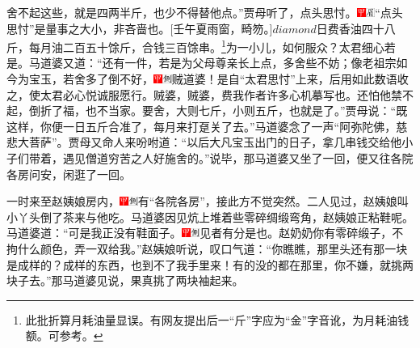 舍不起这些，就是四两半斤，也少不得替他点。”贾母听了，点头思忖。{\includegraphics[width=3mm]{../Images/00002}\includegraphics[width=3mm]{../Images/00010}\footnotesize \kaishu “点头思忖”是量事之大小，非吝啬也。{[}壬午夏雨窗，畸笏。{]}$diamond$日费香油四十八斤，每月油二百五十馀斤，合钱三百馀串。\footnote{此批折算月耗油量显误。有网友提出后一“斤”字应为“金”字音讹，为月耗油钱额。可参考。}为一小儿，如何服众？太君细心若是。}马道婆又道：“还有一件，若是为父母尊亲长上点，多舍些不妨；像老祖宗如今为宝玉，若舍多了倒不好，{\includegraphics[width=3mm]{../Images/00002}\includegraphics[width=3mm]{../Images/00011}\footnotesize \kaishu 贼道婆！是自“太君思忖”上来，后用如此数语收之，使太君必心悦诚服愿行。贼婆，贼婆，费我作者许多心机摹写也。}还怕他禁不起，倒折了福，也不当家。要舍，大则七斤，小则五斤，也就是了。”贾母说：“既这样，你便一日五斤合准了，每月来打趸关了去。”马道婆念了一声“阿弥陀佛，慈悲大菩萨”。贾母又命人来吩咐道：“以后大凡宝玉出门的日子，拿几串钱交给他小子们带着，遇见僧道穷苦之人好施舍的。”说毕，那马道婆又坐了一回，便又往各院各房问安，闲逛了一回。

一时来至赵姨娘房内，{\includegraphics[width=3mm]{../Images/00002}\includegraphics[width=3mm]{../Images/00011}\footnotesize \kaishu 有“各院各房”，接此方不觉突然。}二人见过，赵姨娘叫小丫头倒了茶来与他吃。马道婆因见炕上堆着些零碎绸缎弯角，赵姨娘正粘鞋呢。马道婆道：“可是我正没有鞋面子。{\includegraphics[width=3mm]{../Images/00002}\includegraphics[width=3mm]{../Images/00011}\footnotesize \kaishu 见者有分是也。}赵奶奶你有零碎缎子，不拘什么颜色，弄一双给我。”赵姨娘听说，叹口气道：“你瞧瞧，那里头还有那一块是成样的？成样的东西，也到不了我手里来！有的没的都在那里，你不嫌，就挑两块子去。”那马道婆见说，果真挑了两块袖起来。

